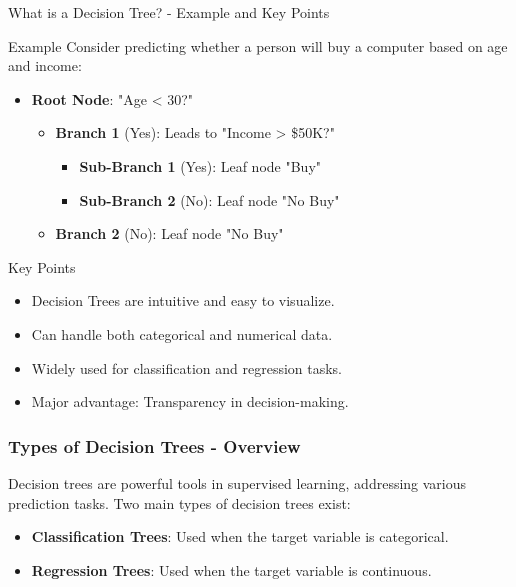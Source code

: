\documentclass[aspectratio=169]{beamer}
\begin{document}
\begin{frame}[fragile]{What is a Decision Tree? - Example and Key Points}
    \begin{block}{Example}
        Consider predicting whether a person will buy a computer based on age and income:
        \begin{itemize}
            \item \textbf{Root Node}: "Age < 30?"
                \begin{itemize}
                    \item \textbf{Branch 1} (Yes): Leads to "Income > \$50K?"
                        \begin{itemize}
                            \item \textbf{Sub-Branch 1} (Yes): Leaf node "Buy"
                            \item \textbf{Sub-Branch 2} (No): Leaf node "No Buy"
                        \end{itemize}
                    \item \textbf{Branch 2} (No): Leaf node "No Buy"
                \end{itemize}
        \end{itemize}
    \end{block}

    \begin{block}{Key Points}
        \begin{itemize}
            \item Decision Trees are intuitive and easy to visualize.
            \item Can handle both categorical and numerical data.
            \item Widely used for classification and regression tasks.
            \item Major advantage: Transparency in decision-making.
        \end{itemize}
    \end{block}
\end{frame}

\begin{frame}[fragile]
    \frametitle{Types of Decision Trees - Overview}
    Decision trees are powerful tools in supervised learning, addressing various prediction tasks. 
    Two main types of decision trees exist:
    \begin{itemize}
        \item \textbf{Classification Trees}: Used when the target variable is categorical.
        \item \textbf{Regression Trees}: Used when the target variable is continuous.
    \end{itemize}
\end{frame}
\end{document}
